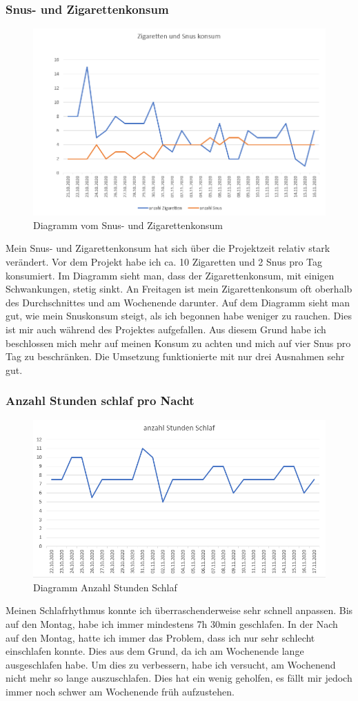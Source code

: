\subsubsection{Snus- und Zigarettenkonsum}
\begin{figure}[H]
  \centering
  \includegraphics[width=0.7\linewidth]{./images/dario_tabak.PNG}
  \caption{Diagramm vom Snus- und Zigarettenkonsum}
\end{figure}
Mein Snus- und Zigarettenkonsum hat sich über die Projektzeit relativ stark verändert. Vor dem Projekt habe ich ca. 10 Zigaretten und 2 Snus pro Tag konsumiert. Im Diagramm sieht man, dass der Zigarettenkonsum, mit einigen Schwankungen, stetig sinkt. An Freitagen ist mein Zigarettenkonsum oft oberhalb des Durchschnittes und am Wochenende darunter.
\newline
Auf dem Diagramm sieht man gut, wie mein Snuskonsum steigt, als ich begonnen habe weniger zu rauchen. Dies ist mir auch während des Projektes aufgefallen. Aus diesem Grund habe ich beschlossen mich mehr auf meinen Konsum zu achten und mich auf vier Snus pro Tag zu beschränken. Die Umsetzung funktionierte mit nur drei Ausnahmen sehr gut.
\subsubsection{Anzahl Stunden schlaf pro Nacht}
\begin{figure}[H]
  \centering
  \includegraphics[width=0.7\linewidth]{./images/dario_schlaf.PNG}
  \caption{Diagramm Anzahl Stunden Schlaf}
\end{figure}
Meinen Schlafrhythmus konnte ich überraschenderweise sehr schnell anpassen. Bis auf den Montag, habe ich immer mindestens 7h 30min geschlafen. In der Nach auf den Montag, hatte ich immer das Problem, dass ich nur sehr schlecht einschlafen konnte. Dies aus dem Grund, da ich am Wochenende lange ausgeschlafen habe. Um dies zu verbessern, habe ich versucht, am Wochenend nicht mehr so lange auszuschlafen. Dies hat ein wenig geholfen, es fällt mir jedoch immer noch schwer am Wochenende früh aufzustehen.
\pagebreak
